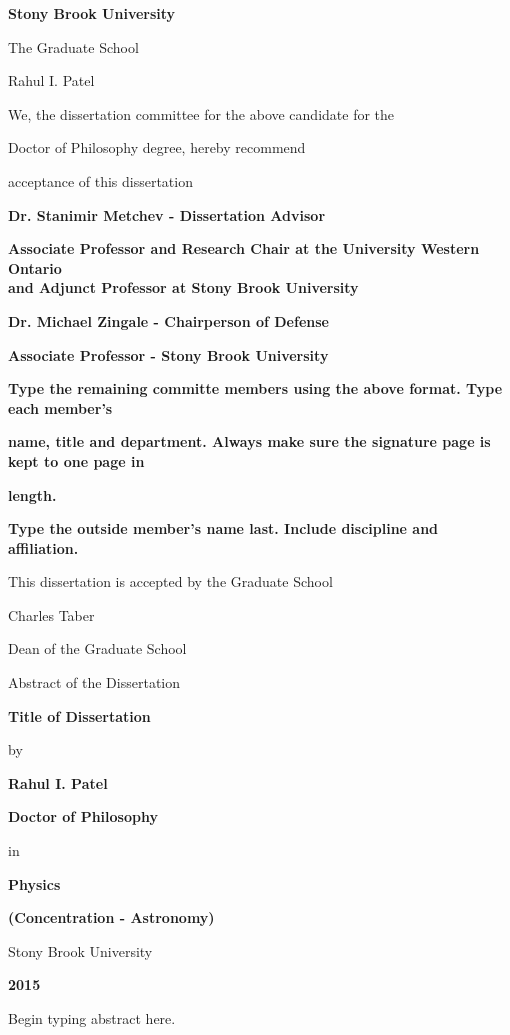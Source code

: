 \documentclass[12pt]{article}
\begin{document}
\centerline{\bf{Stony Brook University}}
\vspace*{1\baselineskip}
\centerline{The Graduate School}
\vspace*{2\baselineskip}
\centerline{Rahul I. Patel}
\vspace*{2\baselineskip}
\centerline{We, the dissertation committee for the above candidate for the}
\vspace*{1\baselineskip}
\centerline{Doctor of Philosophy degree, hereby recommend}
\vspace*{1\baselineskip}
\centerline{acceptance of this dissertation}
\vspace*{2\baselineskip}
\centerline{\bf{Dr. Stanimir Metchev - Dissertation Advisor}}
\centerline{\bf{Associate Professor and Research Chair at the University Western Ontario\\ and Adjunct Professor at Stony Brook University}}
\vspace*{2\baselineskip}
\centerline{\bf{Dr. Michael Zingale - Chairperson of Defense}}
\centerline{\bf{Associate Professor - Stony Brook University}}
\vspace*{2\baselineskip}
\centerline{\bf{Type the remaining committe members using the above format. Type each member's}}
\centerline{\bf{name, title and department. Always make sure the signature page is kept to one page in}} 
\centerline{\bf{length.}}
\vspace*{1\baselineskip}
\centerline{\bf{Type the outside member's name last. Include discipline and affiliation.}}
\vspace*{2\baselineskip}
\centerline{This dissertation is accepted by the Graduate School}
\vspace*{3\baselineskip}
\centerline{Charles Taber}
\centerline{Dean of the Graduate School}

\newpage

\centerline{Abstract of the Dissertation}
\vspace*{1\baselineskip}
\centerline{\bf{Title of Dissertation}}
\vspace*{1\baselineskip}
\centerline{by}
\vspace*{1\baselineskip}
\centerline{\bf{Rahul I. Patel}}
\vspace*{1\baselineskip}
\centerline{\bf{Doctor of Philosophy}}
\vspace*{1\baselineskip}
\centerline{in}
\vspace*{1\baselineskip}
\centerline{\bf{Physics}}
\vspace*{1\baselineskip}
\centerline{\bf{(Concentration - Astronomy)}}
\vspace*{1\baselineskip}
\centerline{Stony Brook University}
\vspace*{1\baselineskip}
\centerline{\bf{2015}}
\vspace*{2\baselineskip}
Begin typing abstract here.
\end{document}

